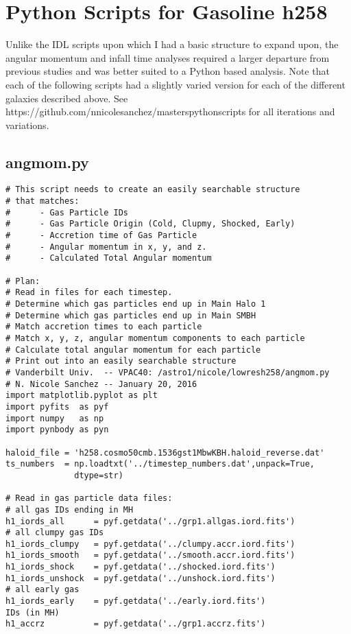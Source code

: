 \documentclass[12pt,headA,chapB]{fiskthesis}
\begin{document}
\section{Python Scripts for Gasoline h258}
Unlike the IDL scripts upon which I had a basic structure to expand upon, the angular momentum and infall time analyses required a larger departure from previous studies and was better suited to a Python based analysis. Note that each of the following scripts had a slightly varied version for each of the different galaxies described above. See https://github.com/nnicolesanchez/masterspythonscripts for all iterations and variations.

\subsection{angmom.py}
\begin{verbatim}
# This script needs to create an easily searchable structure 
# that matches:
#      - Gas Particle IDs
#      - Gas Particle Origin (Cold, Clupmy, Shocked, Early)
#      - Accretion time of Gas Particle
#      - Angular momentum in x, y, and z.
#      - Calculated Total Angular momentum

# Plan:
# Read in files for each timestep.
# Determine which gas particles end up in Main Halo 1 
# Determine which gas particles end up in Main SMBH
# Match accretion times to each particle
# Match x, y, z, angular momentum components to each particle
# Calculate total angular momentum for each particle
# Print out into an easily searchable structure
# Vanderbilt Univ.  -- VPAC40: /astro1/nicole/lowresh258/angmom.py 
# N. Nicole Sanchez -- January 20, 2016 
import matplotlib.pyplot as plt
import pyfits  as pyf
import numpy   as np
import pynbody as pyn

haloid_file = 'h258.cosmo50cmb.1536gst1MbwKBH.haloid_reverse.dat'
ts_numbers  = np.loadtxt('../timestep_numbers.dat',unpack=True,
			  dtype=str)

# Read in gas particle data files:  
# all gas IDs ending in MH
h1_iords_all      = pyf.getdata('../grp1.allgas.iord.fits')    
# all clumpy gas IDs
h1_iords_clumpy   = pyf.getdata('../clumpy.accr.iord.fits')    
h1_iords_smooth   = pyf.getdata('../smooth.accr.iord.fits')
h1_iords_shock    = pyf.getdata('../shocked.iord.fits')
h1_iords_unshock  = pyf.getdata('../unshock.iord.fits')
# all early gas 
h1_iords_early    = pyf.getdata('../early.iord.fits')          
IDs (in MH)
h1_accrz          = pyf.getdata('../grp1.accrz.fits')


\end{verbatim}
\end{document}
